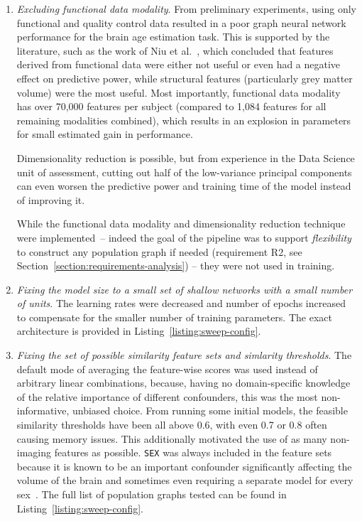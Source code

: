 \begin{enumerate}
    \item \textit{Excluding functional data modality}. From preliminary experiments, using only functional and quality control data resulted in a poor graph neural network performance for the brain age estimation task. This is supported by the literature, such as the work of Niu et al.~\cite{niu2019improved}, which concluded that features derived from functional data were either not useful or even had a negative effect on predictive power, while structural features (particularly grey matter volume) were the most useful. Most importantly, functional data modality has over 70,000 features per subject (compared to 1,084 features for all remaining modalities combined), which results in an explosion in parameters for small estimated gain in performance. 
    
    Dimensionality reduction is possible, but from experience in the Data Science unit of assessment, cutting out half of the low-variance principal components can even worsen the predictive power and training time of the model instead of improving it. 
    
    While the functional data modality and dimensionality reduction technique were implemented~– indeed the goal of the pipeline was to support \textit{flexibility} to construct any population graph if needed (requirement R2, see Section~\ref{section:requirements-analysis}) – they were not used in training.
    \item \textit{Fixing the model size to a small set of shallow networks with a small number of units}. The learning rates were decreased and number of epochs increased to compensate for the smaller number of training parameters. The exact architecture is provided in Listing~\ref{listing:sweep-config}.
    \item \textit{Fixing the set of possible similarity feature sets and simlarity thresholds}. The default mode of averaging the feature-wise scores was used instead of arbitrary linear combinations, because, having no domain-specific knowledge of the relative importance of different confounders, this was the most non-informative, unbiased choice. From running some initial models, the feasible similarity thresholds have been all above 0.6, with even 0.7 or 0.8 often causing memory issues. This additionally motivated the use of as many non-imaging features as possible. \texttt{SEX} was always included in the feature sets because it is known to be an important confounder significantly affecting the volume of the brain and sometimes even requiring a separate model for every sex~\cite{kaufmann2019}. The full list of population graphs tested can be found in Listing~\ref{listing:sweep-config}.
\end{enumerate}

